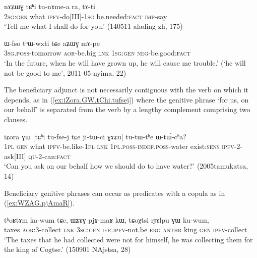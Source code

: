 \begin{exe}
\ex \label{ex:tChi.tunAmea}
\gll nɤʑɯɣ tɕʰi tu-nɤme-a ra, tɤ-ti  \\
\textsc{2sg}:\textsc{gen} what \textsc{ipfv}-do[III]-\textsc{1sg} be.needed:\textsc{fact} \textsc{imp}-say \\
\glt `Tell me what I shall do for you.' (140511 alading-zh, 175)
\end{exe}

\begin{exe}
\ex \label{ex:aZWG.mApe}
\gll  ɯ-fso tʰɯ-wxti tɕe aʑɯɣ mɤ-pe \\ 
\textsc{3sg}.\textsc{poss}-tomorrow \textsc{aor}-be.big \textsc{lnk} \textsc{1sg}:\textsc{gen} \textsc{neg}-be.good:\textsc{fact} \\
\glt `In the future, when he will have grown up, he will cause me trouble.' (`he will not be good to me', 2011-05-nyima, 22)
\end{exe}

The beneficiary adjunct is not necessarily contiguous with the verb on which it depends, as in (\ref{ex:iZora.GW.tChi.tufsej}) where the genitive phrase  `for us, on our behalf'  is separated from the verb  by a lengthy complement comprising two clauses.

\begin{exe}
\ex \label{ex:iZora.GW.tChi.tufsej}
\gll  iʑora ɣɯ [tɕʰi tu-fse-j tɕe ji-tɯ-ci ɣɤʑu] tu-tɯ-tʰe ɯ-tɯ́-cʰa? \\
\textsc{1pl} \textsc{gen} what \textsc{ipfv}-be.like-\textsc{1pl} \textsc{lnk} \textsc{1pl}.\textsc{poss}-\textsc{indef}.\textsc{poss}-water exist:\textsc{sens} \textsc{ipfv}-2-ask[III] \textsc{qu}-2-can:\textsc{fact} \\
\glt `Can you ask on our behalf how we should do to have water?' (2005tamukatsa, 14)
\end{exe}

Beneficiary genitive phrases can occur as predicates with a copula as  in (\ref{ex:WZAG.pjAmaR}).

 \begin{exe}
\ex \label{ex:WZAG.pjAmaR}
\gll   tʰoʁtɤm ka-wum tɕe, ɯʑɤɣ pjɤ-maʁ kɯ, tɕoχtsi rɟɤlpu ɣɯ ku-wum,  \\
taxes \textsc{aor}:3\flobv{}-collect \textsc{lnk} \textsc{3sg}:\textsc{gen} \textsc{ifr}.\textsc{ipfv}-not.be \textsc{erg}  \textsc{anthr} king \textsc{gen} \textsc{ipfv}-collect \\
\glt `The taxes that he had collected were not for himself, he was collecting them for the king of Cogtse.' (150901 NAjstsa, 28)
\end{exe}

